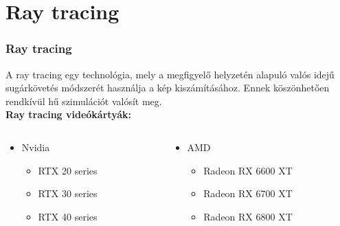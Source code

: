 \documentclass[tikz,border=10pt]{beamer}
\begin{document}
\section{Ray tracing}
\begin{frame}
\frametitle{Ray tracing}

\transwipe[direction=180]

A ray tracing egy technológia, mely a megfigyelő helyzetén alapuló valós idejű sugárkövetés módszerét használja a kép kiszámításához. Ennek köszönhetően rendkívül hű szimulációt valósít meg.
\\
\textbf{Ray tracing videókártyák:}
\begin{columns}[onlytextwidth]
\begin{column}{.5\textwidth}

\begin{itemize}
\item<1-> Nvidia \pause
\begin{itemize}
\item RTX 20 series 
\item RTX 30 series 
\item RTX 40 series 
\end{itemize}
\end{itemize}
\end{column}

\begin{column}{.5\textwidth}
\begin{itemize}
\item<2-> AMD \pause
\begin{itemize}
\item Radeon RX 6600 XT 
\item Radeon RX 6700 XT 
\item Radeon RX 6800 XT 
\end{itemize}

\end{itemize}

\end{column}
\end{columns}
\end{frame}
\end{document}

